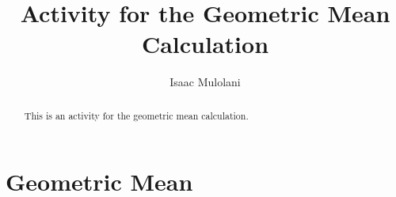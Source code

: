 \documentclass{ximera}
\title{Activity for the Geometric Mean Calculation}
\author{Isaac Mulolani}
\begin{document}
\begin{abstract}
This is an activity for the geometric mean calculation.
\end{abstract}

\maketitle


\section*{Geometric Mean}

\begin{question}



\end{question}



\begin{question}



\end{question}


\begin{question}



\end{question}


\begin{question}



\end{question}


\begin{question}



\end{question}
\end{document}
